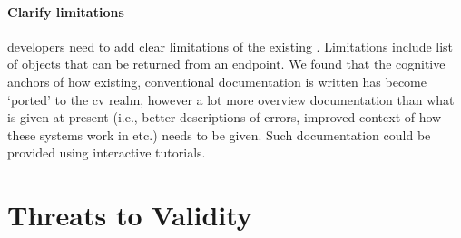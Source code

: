 \paragraph{Clarify limitations}  developers need to add clear limitations of the existing . Limitations include list of objects that can be returned from an endpoint.  We found that the cognitive anchors of how existing, conventional  documentation is written has become `ported' to the \gls{cv} realm, however a lot more overview documentation than what is given at present (i.e., better descriptions of errors, improved context of how these systems work in etc.) needs to be given.
Such documentation could be provided using interactive tutorials.

%


%
%
%
%
%




\section{Threats to Validity}
\label{icse2020:sec:limitations}

%

